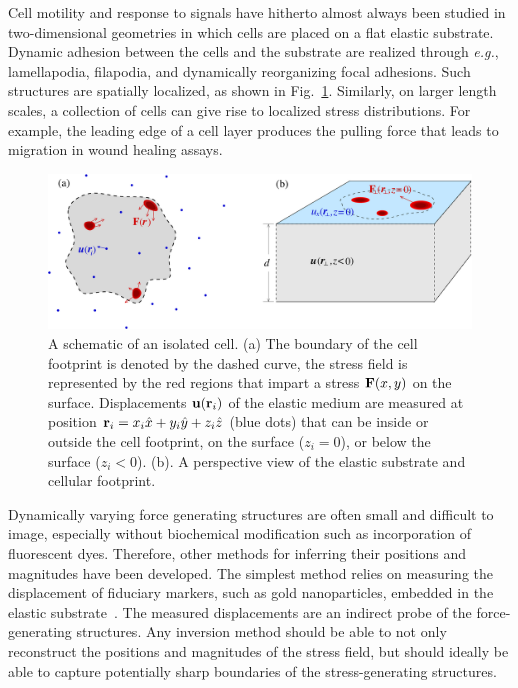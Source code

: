 \documentclass[aps,prl,reprint,twocolumn,groupedaddress,showpacs]{revtex4-1}
\def\r{{\bf r}}
\begin{document}
Cell motility and response to signals have hitherto almost always been
studied in two-dimensional geometries in which cells are placed on a
flat elastic substrate.  Dynamic adhesion between the cells and the
substrate are realized through {\it e.g.}, lamellapodia, filapodia,
and dynamically reorganizing focal adhesions.  Such structures are
spatially localized, as shown in Fig.~\ref{FIG1}. Similarly, on larger
length scales, a collection of cells can give rise to localized stress
distributions. For example, the leading edge of a cell layer produces
the pulling force that leads to migration in wound healing assays.

\begin{figure}[t]
\begin{center}
\includegraphics[width=\linewidth]{Fig1}
\caption{A schematic of an isolated cell. (a) The boundary of the cell
  footprint is denoted by the dashed curve, the stress field is
  represented by the red regions that impart a stress ${\bf F}(x,y)$
  on the surface. Displacements ${\bf u}(\r_{i})$ of the elastic
  medium are measured at position $\r_{i} =
  x_{i}\hat{x}+y_{i}\hat{y}+z_{i}\hat{z}$ (blue dots) that can be
  inside or outside the cell footprint, on the surface ($z_{i}=0$), or
  below the surface ($z_{i}<0$). (b). A perspective view of the
  elastic substrate and cellular footprint.}
\label{FIG1}
\end{center}
\end{figure}


Dynamically varying force generating structures are often small and
difficult to image, especially without biochemical modification such
as incorporation of fluorescent dyes. Therefore, other methods for
inferring their positions and magnitudes have been developed. The
simplest method relies on measuring the displacement of fiduciary
markers, such as gold nanoparticles, embedded in the elastic
substrate~\cite{wang2007cell}. The measured displacements are an indirect probe of the
force-generating structures.  Any inversion method should be able to
not only reconstruct the positions and magnitudes of the stress field,
but should ideally be able to capture potentially sharp boundaries of
the stress-generating structures.
\end{document}
